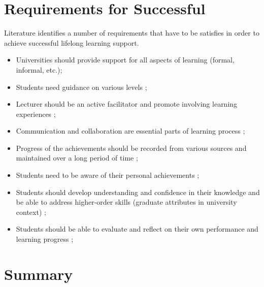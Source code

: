 \section{Requirements for Successful \LLLc}
 
Literature identifies a number of requirements that have to be satisfies in
order to achieve successful lifelong learning support.
 
\begin{itemize}
  \item Universities should provide support for all aspects of learning (formal,
  informal, etc.); 
  \item Students need guidance on various levels \citep{Leone2019};
  \item Lecturer should be an active facilitator and promote involving learning
experiences \citep{Leone2019}; 
  \item Communication and collaboration are essential parts of learning process
  \citep{Schaffert2008};
  \item Progress of the achievements should be recorded from various sources and
maintained over a long period of time \citep{Kay2008}; 
  \item Students need to be aware of their personal achievements
\citep{Schuetze2006};
  \item Students should develop understanding and confidence in their knowledge
  and be able to address higher-order skills (graduate attributes in university
  context) \citep{Hart1999};
  \item Students should be able to evaluate and reflect on their own performance
and learning progress \citep{Mourtos2003};
\end{itemize} 

\section{Summary} 